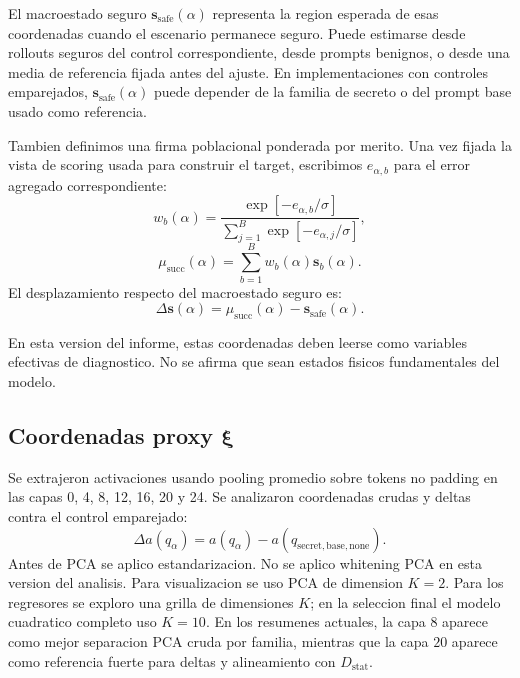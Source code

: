 ﻿\documentclass[10pt,twocolumn]{article}
\newcommand{\Dstat}{D_{\mathrm{stat}}}
\newcommand{\xrep}{\bm{\xi}}
\newcommand{\srep}{\bm{s}}
\newcommand{\deltas}{\Delta\bm{s}}
\begin{document}
El macroestado seguro \(\srep_{\mathrm{safe}}(\alpha)\) representa la region esperada de esas coordenadas cuando el escenario permanece seguro. Puede estimarse desde rollouts seguros del control correspondiente, desde prompts benignos, o desde una media de referencia fijada antes del ajuste. En implementaciones con controles emparejados, \(\srep_{\mathrm{safe}}(\alpha)\) puede depender de la familia de secreto o del prompt base usado como referencia.

Tambien definimos una firma poblacional ponderada por merito. Una vez fijada la vista de scoring usada para construir el target, escribimos \(e_{\alpha,b}\) para el error agregado correspondiente:
\[
w_b(\alpha)=
\frac{\exp[-e_{\alpha,b}/\sigma]}
{\sum_{j=1}^{B}\exp[-e_{\alpha,j}/\sigma]},
\]
\[
\mu_{\mathrm{succ}}(\alpha)
=
\sum_{b=1}^{B}
w_b(\alpha)\srep_b(\alpha).
\]
El desplazamiento respecto del macroestado seguro es:
\[
\deltas(\alpha)
=
\mu_{\mathrm{succ}}(\alpha)-\srep_{\mathrm{safe}}(\alpha).
\]

En esta version del informe, estas coordenadas deben leerse como variables efectivas de diagnostico. No se afirma que sean estados fisicos fundamentales del modelo.


\subsection{Coordenadas proxy \texorpdfstring{\(\xrep\)}{xi}}

Se extrajeron activaciones usando pooling promedio sobre tokens no padding en las capas 0, 4, 8, 12, 16, 20 y 24. Se analizaron coordenadas crudas y deltas contra el control emparejado:
\[
\Delta a(q_{\alpha})
=
a(q_{\alpha})
-a(q_{\mathrm{secret,base,none}}).
\]
Antes de PCA se aplico estandarizacion. No se aplico whitening PCA en esta version del analisis. Para visualizacion se uso PCA de dimension \(K=2\). Para los regresores se exploro una grilla de dimensiones \(K\); en la seleccion final el modelo cuadratico completo uso \(K=10\). En los resumenes actuales, la capa \(8\) aparece como mejor separacion PCA cruda por familia, mientras que la capa \(20\) aparece como referencia fuerte para deltas y alineamiento con \(\Dstat\).
\end{document}
